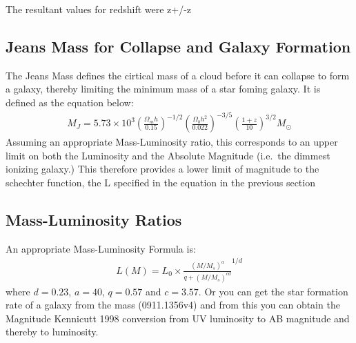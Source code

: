 		The resultant values for redshift were z+/-z

	\subsection{Jeans Mass for Collapse and Galaxy Formation} %
	\label{sub:jeans_mass_for_collapse_and_galaxy_formation}
		The Jeans Mass defines the cirtical mass of a cloud before it can collapse to form a galaxy, thereby limiting the minimum mass of a star foming galaxy. It is defined as the equation below:
		\begin{align}
			M_J = 5.73\times 10^3{\left(\frac{\Omega_m h}{0.15} \right)}^{-1/2} {\left( \frac{\Omega_b h^2}{0.022}\right)}^{-3/5} {\left( \frac{1+z}{10} \right)}^{3/2} M_\odot
		\end{align}
		Assuming an appropriate Mass-Luminosity ratio, this corresponds to an upper limit on both the Luminosity and the Absolute Magnitude (i.e.\ the dimmest ionizing galaxy.) This therefore provides a lower limit of magnitude to the schechter function, the L specified in the equation in the previous section


	\subsection{Mass-Luminosity Ratios} %
	\label{sub:mass_luminosity_ratios}
		An appropriate Mass-Luminosity Formula is:
		\begin{align}
			L(M) = L_0 \times \frac{{(M/M_s)}^a}{q+{(M/M_s)}^{cd}}^{1/d}
		\end{align}
		where $d=0.23$, $a=40$, $q=0.57$ and $c=3.57$. Or you can get the star formation rate of a galaxy from the mass (0911.1356v4) and from this you can obtain the Magnitude Kennicutt 1998 conversion from UV luminosity to AB magnitude and thereby to luminosity.

